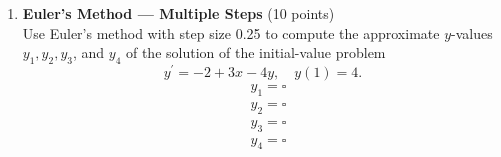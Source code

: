 \begin{enumerate}
  \item \textbf{Euler's Method --- Multiple Steps} (10 points)\\
  Use Euler's method with step size 0.25 to compute the approximate $y$-values $y_1, y_2, y_3$, and $y_4$ of the solution of the initial-value problem
  $$
  y^{\prime}=-2+3 x-4 y, \quad y(1)=4 .
  $$
  $$
  \begin{aligned}
  & y_1=\square \\
  & y_2=\square \\
  & y_3=\square \\
  & y_4=\square
  \end{aligned}
  $$
  \begin{subanswer}
  \end{subanswer}

\end{enumerate}
